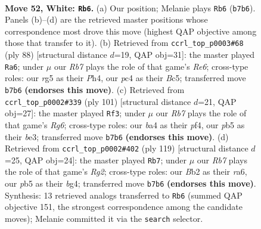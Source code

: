 \documentclass[11pt]{article}
\begin{document}
\clearpage

\begin{figure}[p]\centering
\begin{subfigure}{0.46\textwidth}\centering
\resizebox{\linewidth}{!}{%
\newchessgame
\chessboard[
  setfen={2k5/1R6/8/pp4r1/b1p5/P1P5/1B3K2/8 w - - 10 52},
  showmover=false,
  pgfstyle=straightmove, color=movearrow, markmove={b7-b6}
]}
\caption{}
\end{subfigure}\hfill
\begin{subfigure}{0.46\textwidth}\centering
\resizebox{\linewidth}{!}{%
\newchessgame
\chessboard[
  setfen={b1r5/5kp1/4R2p/2B5/1P3p1P/8/5P1K/8 w - - 1 45},
  showmover=false,
  pgfstyle=straightmove, color=movearrow, markmove={e6-a6}
]}
\caption{}
\end{subfigure}
\\[4pt]
\begin{subfigure}{0.46\textwidth}\centering
\resizebox{\linewidth}{!}{%
\newchessgame
\chessboard[
  setfen={8/5k2/4b3/1p2Pp2/5P1K/P3B1r1/8/4R3 b - - 10 51},
  showmover=false,
  pgfstyle=straightmove, color=movearrow, markmove={g3-f3}
]}
\caption{}
\end{subfigure}\hfill
\begin{subfigure}{0.46\textwidth}\centering
\resizebox{\linewidth}{!}{%
\newchessgame
\chessboard[
  setfen={5k2/6r1/R4K1p/8/6Bp/6bP/6P1/8 b - - 46 60},
  showmover=false,
  pgfstyle=straightmove, color=movearrow, markmove={g7-b7}
]}
\caption{}
\end{subfigure}
\caption{\textbf{Move 52, White: \texttt{Rb6}.} (a) Our position; Melanie plays \texttt{Rb6} (\texttt{b7b6}). Panels (b)--(d) are the retrieved master positions whose correspondence most drove this move (highest QAP objective among those that transfer to it). (b) Retrieved from \texttt{ccrl\_top\_p0003\#68} (ply 88) [structural distance $d$=19, QAP obj=31]: the master played \texttt{Ra6}; under $\mu$ our \emph{Rb7} plays the role of that game's \emph{Re6}; cross-type roles: our \emph{r}g5 as their \emph{P}h4, our \emph{p}c4 as their \emph{B}c5; transferred move \texttt{b7b6} \textbf{(endorses this move)}. (c) Retrieved from \texttt{ccrl\_top\_p0002\#339} (ply 101) [structural distance $d$=21, QAP obj=27]: the master played \texttt{Rf3}; under $\mu$ our \emph{Rb7} plays the role of that game's \emph{Rg6}; cross-type roles: our \emph{b}a4 as their \emph{p}f4, our \emph{p}b5 as their \emph{b}e3; transferred move \texttt{b7b6} \textbf{(endorses this move)}. (d) Retrieved from \texttt{ccrl\_top\_p0002\#402} (ply 119) [structural distance $d$=25, QAP obj=24]: the master played \texttt{Rb7}; under $\mu$ our \emph{Rb7} plays the role of that game's \emph{Rg2}; cross-type roles: our \emph{B}b2 as their \emph{r}a6, our \emph{p}b5 as their \emph{b}g4; transferred move \texttt{b7b6} \textbf{(endorses this move)}. Synthesis: 13 retrieved analogs transferred to \texttt{Rb6} (summed QAP objective 151, the strongest correspondence among the candidate moves); Melanie committed it via the \texttt{search} selector.}
\label{fig:thought-m102}
\end{figure}
\end{document}
